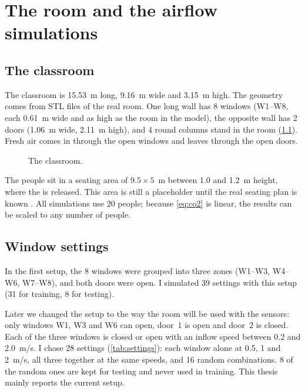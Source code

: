 \chapter{The room and the airflow simulations}
\label{ch:room}

\section{The classroom}
The classroom is 15.53~m long, 9.16~m wide and 3.15~m high. The geometry comes from STL files of the
real room. One long wall has 8 windows (W1--W8, each 0.61~m wide and as high as the room in the model),
the opposite wall has 2 doors (1.06~m wide, 2.11~m high), and 4 round columns stand in the room
(\cref{fig:room}). Fresh air comes in through the open windows and leaves through the open doors.

\begin{figure}[h]
  \centering
  \caption{The classroom. }
  \label{fig:room}
\end{figure}

The people sit in a seating area of $9.5\times5$~m between 1.0 and 1.2~m height, where the \cotwo{} is
released. This area is still a placeholder until the real seating plan is known
. All simulations use 20 people; because
\cref{eq:co2} is linear, the results can be scaled to any number of people.

\section{Window settings}
In the first setup, the 8 windows were grouped into three zones (W1--W3, W4--W6, W7--W8), and both doors were
open. I simulated 39 settings with this setup (31 for training, 8 for testing).

Later we changed the setup to the way the room will be used with the sensors: only windows W1, W3 and W6 can
open, door~1 is open and door~2 is closed. Each of the three windows is closed or open with an inflow speed
between 0.2 and 2.0~m/s. I chose 28 settings (\cref{tab:settings}): each window alone at 0.5, 1 and 2~m/s,
all three together at the same speeds, and 16 random combinations. 8 of the random ones are kept for
testing and never used in training. This thesis mainly reports the current setup.

